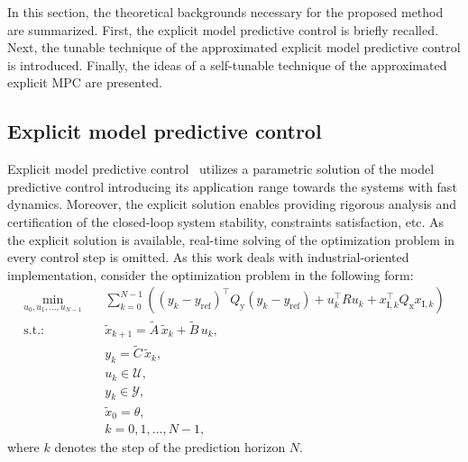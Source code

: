 \documentclass[preprint,12pt]{elsarticle}
\begin{document}
	In this section, the theoretical backgrounds necessary for the proposed method are summarized. First, the explicit model predictive control is briefly recalled. Next, the tunable technique of the approximated explicit model predictive control is introduced. Finally, the ideas of a self-tunable technique of the approximated explicit MPC are presented.
	
	\subsection{Explicit model predictive control}
	\label{sec:eMPC}
	
	Explicit model predictive control~\cite{Bemporad_automatica} utilizes a parametric solution of the model predictive control introducing its application range towards the systems with fast dynamics. Moreover, the explicit solution enables providing rigorous analysis and certification of the closed-loop system stability, constraints satisfaction, etc. As the explicit solution is available, real-time solving of the optimization problem in every control step is omitted. As this work deals with industrial-oriented implementation, consider the optimization problem in the following form:
	\begin{subequations}
		\label{eq:mpc_problem}
		\begin{eqnarray}
			\label{eq:mpc_problem_cost}
			\min_{u_0,u_{1},\ldots,u_{N-1}} &~& \! \sum_{k=0}^{N-1} \! \left( (y_k-y_\mathrm{ref})^{\intercal} Q_\mathrm{y} (y_k-y_\mathrm{ref}) + u_{k}^{\intercal} R u_{k} + x_{\mathrm{I},k}^{\intercal} Q_\mathrm{x} x_{\mathrm{I},k} \right)  \\
			\label{eq:mpc_problem_prediction_model_x}
			\mathrm{s.t.\!:} &~& \widetilde{x}_{k+1} = \widetilde{A}\,\widetilde{x}_{k} + \widetilde{B}\,u_{k}, \\
			\label{eq:mpc_problem_prediction_model_y}
			&~& y_{k} = \widetilde{C}\,\widetilde{x}_{k}, \\
			\label{eq:mpc_problem_input_constraints}
			&~& u_{k} \in \mathcal{U}, \\
			\label{eq:mpc_problem_state_constraints}
			&~& y_{k} \in \mathcal{Y}, \\
			\label{eq:mpc_problem_initial_coindition}
			&~& \widetilde{x}_{0} = \theta, \\
			\label{eq:mpc_problem_k_range}
			&~& k = 0,1,\ldots, N-1,
		\end{eqnarray}
	\end{subequations}
	where $k$ denotes the step of the prediction horizon $N$. 
\end{document}
